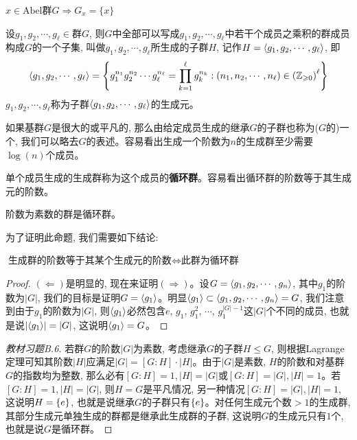 \begin{exercise}[教材B.5]
    $x\in\text{Abel群$G$}\Longrightarrow G_x=\{x\}$
\end{exercise}
\begin{definition}[生成元]
    设$g_1,g_2,\cdots,g_\ell\in\text{群$G$}$, 则$G$中全部可以写成$g_1,g_2,\cdots,g_\ell$中若干个成员之乘积的群成员构成$G$的一个子集, 叫做$g_1,g_2,\cdots,g_\ell$所生成的子群$H$, 记作$H=\expval{g_1,g_2,\cdots,g_\ell}$, 即
    $$\expval{g_1,g_2,\cdots,g_\ell}=\qty{g_1^{n_1}g_2^{n_2}\cdots g_\ell^{n_\ell}=\prod_{k=1}^\ell g_k^{n_k}:(n_1,n_2,\cdots,n_\ell)\in\qty(\mathbb{Z}_{\geqslant0})^\ell}$$
    $g_1,g_2,\cdots,g_\ell$称为子群$\expval{g_1,g_2,\cdots,g_\ell}$的生成元。
\end{definition}
\par 如果基群$G$是很大的或平凡的, 那么由给定成员生成的继承$G$的子群也称为($G$的)一个, 我们可以略去$G$的表述。容易看出生成一个阶数为$n$的生成群至少需要$\log(n)$个成员。
\begin{definition}[循环群]
    单个成员生成的生成群称为这个成员的\textbf{循环群}。容易看出循环群的阶数等于其生成元的阶数。
\end{definition}
\begin{exercise}[教材B.6]
    阶数为素数的群是循环群。
\end{exercise}
\par 为了证明此命题, 我们需要如下结论:
\begin{proposition}
    $\text{生成群的阶数等于其某个生成元的阶数}\Longleftrightarrow\text{此群为循环群}$
\end{proposition}
\begin{proof}
    $(\Longleftarrow)$是明显的, 现在来证明$(\Longrightarrow)$。设$G=\expval{g_1,g_2,\cdots,g_n}$, 其中$g_1$的阶数为$|G|$, 我们的目标是证明$G=\expval{g_1}$。明显$\expval{g_1}\subset\expval{g_1,g_2,\cdots,g_n}=G$, 我们注意到由于$g_1$的阶数为$|G|$, 则$\expval{g_1}$必然包含$e$, $g_1$, $g_1^2$, $\cdots$, $g_1^{|G|-1}$这$|G|$个不同的成员, 也就是说$\qty|\expval{g_1}|=|G|$, 这说明$\expval{g_1}=G$。
\end{proof}
\begin{proof}[教材习题B.6]
    若群$G$的阶数$|G|$为素数, 考虑继承$G$的子群$H\leq G$, 则根据Lagrange定理可知其阶数$|H|$应满足$|G|=[G:H]\cdot |H|$。由于$|G|$是素数, $H$的阶数和对基群$G$的指数均为整数, 那么必有$[G:H]=1, |H|=|G|$或$[G:H]=|G|, |H|=1$。若$[G:H]=1, |H|=|G|$, 则$H=G$是平凡情况, 另一种情况$[G:H]=|G|, |H|=1$, 这说明$H=\qty{e}$, 也就是说继承$G$的子群只有$\qty{e}$。对任何生成元个数$>1$的生成群, 其部分生成元单独生成的群都是继承此生成群的子群, 这说明$G$的生成元只有$1$个, 也就是说$G$是循环群。
\end{proof}

